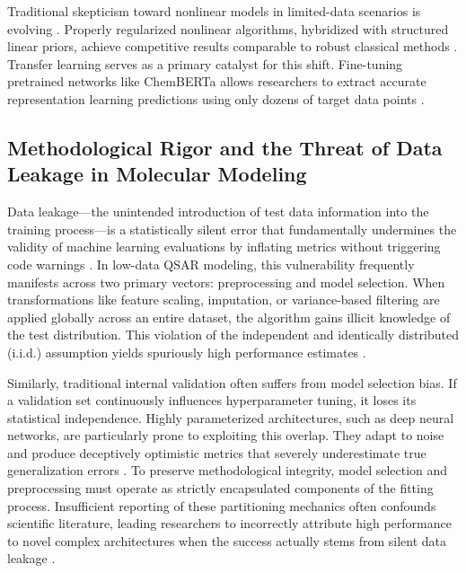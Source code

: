 Traditional skepticism toward nonlinear models in limited-data scenarios is evolving \cite{Dalmau2025}. Properly regularized nonlinear algorithms, hybridized with structured linear priors, achieve competitive results comparable to robust classical methods \cite{Dalmau2025, salman2023}. Transfer learning serves as a primary catalyst for this shift. Fine-tuning pretrained networks like ChemBERTa allows researchers to extract accurate representation learning predictions using only dozens of target data points \cite{latefa2025, samuel2023}.

\subsection{Methodological Rigor and the Threat of Data Leakage in Molecular Modeling}

Data leakage—the unintended introduction of test data information into the training process—is a statistically silent error that fundamentally undermines the validity of machine learning evaluations by inflating metrics without triggering code warnings \cite{brva2026, gerz2026}. In low-data QSAR modeling, this vulnerability frequently manifests across two primary vectors: preprocessing and model selection. When transformations like feature scaling, imputation, or variance-based filtering are applied globally across an entire dataset, the algorithm gains illicit knowledge of the test distribution. This violation of the independent and identically distributed (i.i.d.) assumption yields spuriously high performance estimates \cite{correa2025, lewis2023}.

Similarly, traditional internal validation often suffers from model selection bias. If a validation set continuously influences hyperparameter tuning, it loses its statistical independence. Highly parameterized architectures, such as deep neural networks, are particularly prone to exploiting this overlap. They adapt to noise and produce deceptively optimistic metrics that severely underestimate true generalization errors \cite{bauman2014, sotirios2025}. To preserve methodological integrity, model selection and preprocessing must operate as strictly encapsulated components of the fitting process. Insufficient reporting of these partitioning mechanics often confounds scientific literature, leading researchers to incorrectly attribute high performance to novel complex architectures when the success actually stems from silent data leakage \cite{rojas2026}.

